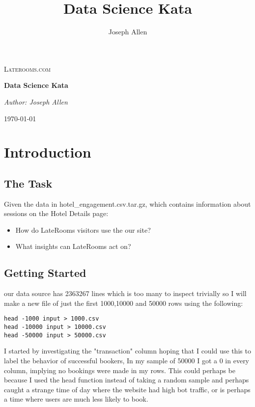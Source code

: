 \documentclass[a4paper]{report}
\title{Data Science Kata}
\author{Joseph Allen}
\begin{document}
\begin{titlepage}
	\centering
	{\scshape\LARGE Laterooms.com  \par}
	\vspace{1.5cm}
	{\huge\bfseries Data Science Kata\par}
	\vspace{2cm}
	{\Large\itshape Author: Joseph Allen\par}

	\vfill

	{\large \today\par}
\end{titlepage}

\chapter{Introduction}
\section{The Task}
Given the data in hotel\_engagement.csv.tar.gz, which contains information about sessions on the Hotel Details page:

\begin{itemize}
\item How do LateRooms visitors use the our site?
\item What insights can LateRooms act on?
\end{itemize}

\section{Getting Started}
our data source has 2363267 lines which is too many to inspect trivially so I will make a new file of just the first 1000,10000 and 50000 rows using the following: 
\begin{lstlisting}
head -1000 input > 1000.csv
head -10000 input > 10000.csv
head -50000 input > 50000.csv
\end{lstlisting}

I started by investigating the "transaction" column hoping that I could use this to label the behavior of successful bookers, In my sample of 50000 I got a 0 in every column, implying no bookings were made in my rows. This could perhaps be because I used the head function instead of taking a random sample and perhaps caught a strange time of day where the website had high bot traffic, or is perhaps a time where users are much less likely to book.
\end{document}

